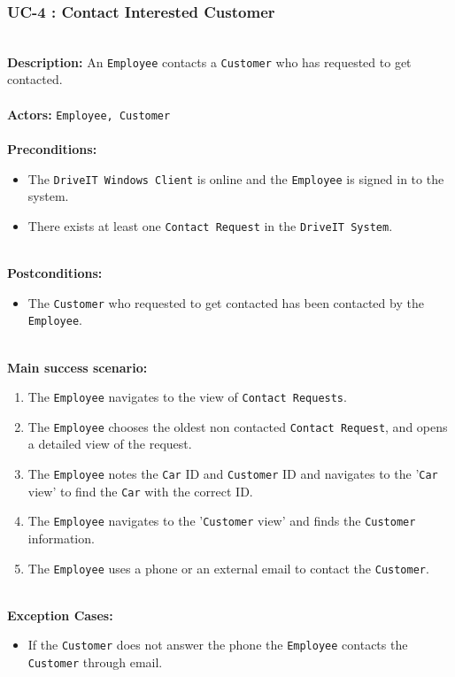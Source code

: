 \subsubsection{UC-4 : Contact Interested Customer}
\label{contact-interested-customer-use-case}
\HRule \\[0.4cm]
\textbf{Description:} An \texttt{Employee} contacts a \texttt{Customer} who has requested to get contacted. \\
\HRule \\[0.4cm]
\textbf{Actors:} \texttt{Employee, Customer}\\
\HRule \\[0.4cm]
\textbf{Preconditions:} 
\begin{itemize}
    \item The \texttt{DriveIT Windows Client} is online and the \texttt{Employee} is signed in to the system.
    \item There exists at least one \texttt{Contact Request} in the \texttt{DriveIT System}.
\end{itemize}
\HRule \\[0.4cm]
\textbf{Postconditions:}
\begin{itemize}
    \item The \texttt{Customer} who requested to get contacted has been contacted by the \texttt{Employee}.
\end{itemize}
\HRule \\[0.4cm]
\textbf{Main success scenario:}
\begin{enumerate}
    \item The \texttt{Employee} navigates to the view of \texttt{Contact Requests}.
    \item The \texttt{Employee} chooses the oldest non contacted \texttt{Contact Request}, and opens a detailed view of the request.
    \item The \texttt{Employee} notes the \texttt{Car} ID and \texttt{Customer} ID and navigates to the '\texttt{Car} view' to find the \texttt{Car} with the correct ID.  
    \item The \texttt{Employee} navigates to the '\texttt{Customer} view' and finds the \texttt{Customer} information. 
    \item The \texttt{Employee} uses a phone or an external email to contact the \texttt{Customer}.
\end{enumerate}
\HRule \\[0.4cm]
\textbf{Exception Cases:}
\begin{itemize}
	\item If the \texttt{Customer} does not answer the phone the \texttt{Employee} contacts the \texttt{Customer} through email.
\end{itemize}
